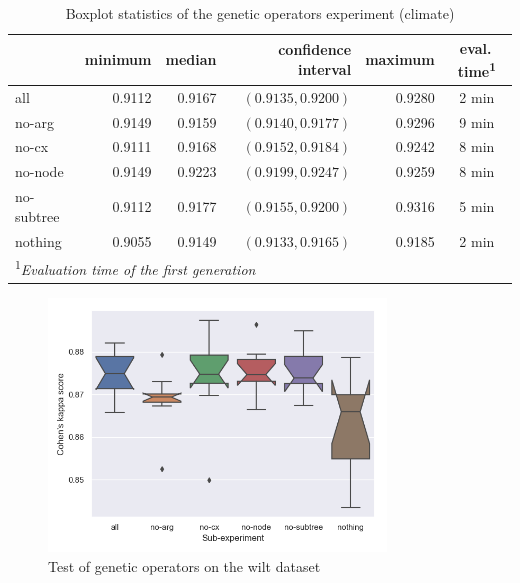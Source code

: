 \begin{table}[ht]
\centering
\caption{Boxplot statistics of the genetic operators experiment (climate)}\label{tab04:exp2:cboxstats}
\begin{tabular}{lrrrr|c}
\toprule
{} &  minimum & median &  confidence interval &  maximum  & eval.\,time\textsuperscript{1} \\
\midrule
all        &   0.9112 &  0.9167 &   $(0.9135, 0.9200)$ &   0.9280 & 2 min \\
no-arg     &   0.9149 &  0.9159 &   $(0.9140, 0.9177)$ &   0.9296 & 9 min \\
no-cx      &   0.9111 &  0.9168 &   $(0.9152, 0.9184)$ &   0.9242 & 8 min \\
no-node    &   0.9149 &  0.9223 &   $(0.9199, 0.9247)$ &   0.9259 & 8 min \\
no-subtree &   0.9112 &  0.9177 &   $(0.9155, 0.9200)$ &   0.9316 & 5 min \\
nothing    &   0.9055 &  0.9149 &   $(0.9133, 0.9165)$ &   0.9185 & 2 min \\
\bottomrule

\multicolumn{6}{l}{\footnotesize\textsuperscript{1}\itshape Evaluation time of the first generation}

\end{tabular}

\end{table}

\begin{figure}[pt]\centering
\includegraphics[width=0.8\textwidth]{../img/wilt-mut-redo.png}
\caption{Test of genetic operators on the wilt dataset}
\label{pic04:mut-wilt}
\end{figure}

